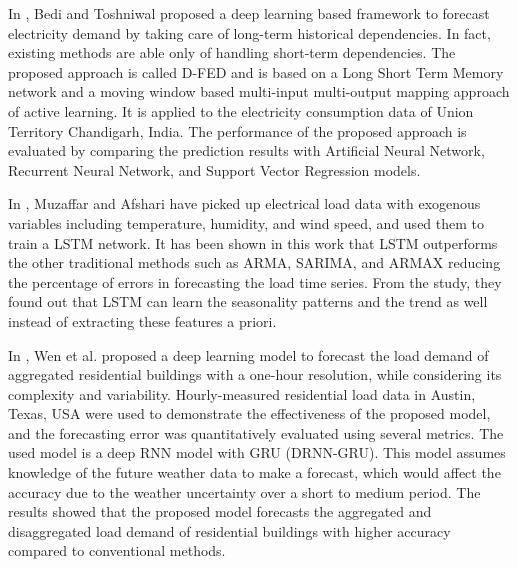 In \cite{BEDI20191312}, Bedi and Toshniwal proposed a deep learning based framework to forecast electricity demand by taking care of long-term historical dependencies.
In fact, existing methods are able only of handling short-term dependencies.
The proposed approach is called D-FED and is based on a Long Short Term Memory network and a moving window based multi-input multi-output mapping approach of active learning.
It is applied to the electricity consumption data of Union Territory Chandigarh, India.
The performance of the proposed approach is evaluated by comparing the prediction results with Artificial Neural Network, Recurrent Neural Network, and Support Vector Regression models.

In \cite{MUZAFFAR20192922}, Muzaffar and Afshari have picked up electrical load data with exogenous variables including temperature, humidity, and wind speed, and used them to train a LSTM network.
It has been shown in this work that LSTM outperforms the other traditional methods such as ARMA, SARIMA, and ARMAX reducing the percentage of errors in forecasting the load time series.
From the study, they found out that LSTM can learn the seasonality patterns and the trend as well instead of extracting these features a priori.

In \cite{WEN2020106073}, Wen et al. proposed a deep learning model to forecast the load demand of aggregated residential buildings with a one-hour resolution, while considering its complexity and variability.
Hourly-measured residential load data in Austin, Texas, USA were used to demonstrate the effectiveness of the proposed model, and the forecasting error was quantitatively evaluated using several metrics.
The used model is a deep RNN model with GRU (DRNN-GRU).
This model assumes knowledge of the future weather data to make a forecast, which would affect the accuracy due to the weather uncertainty over a short to medium period.
The results showed that the proposed model forecasts the aggregated and disaggregated load demand of residential buildings with higher accuracy compared to conventional methods.

